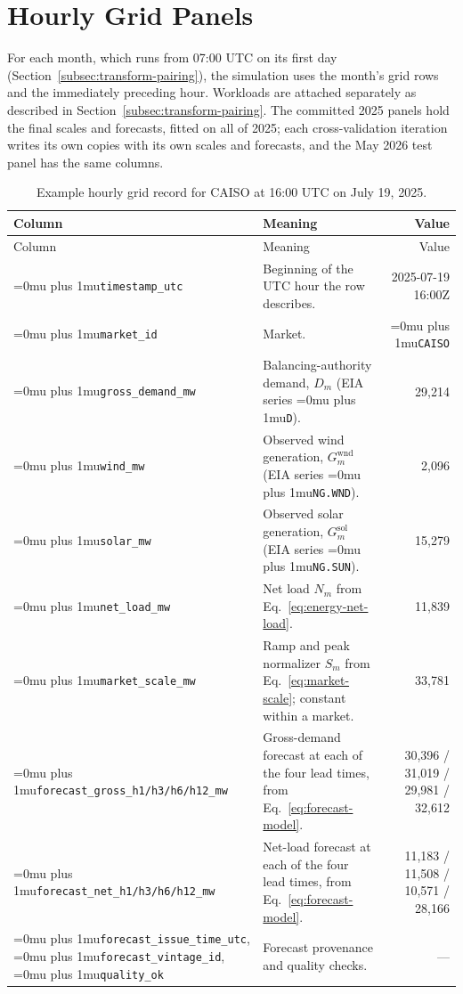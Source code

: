 \documentclass{UNCC-thesis}
\newcommand{\codepath}[1]{{\Urlmuskip=0mu plus 1mu\relax\nolinkurl{#1}}}
\begin{document}
\section{Hourly Grid Panels}
For each month, which runs from 07:00 UTC on its first day
(Section~\ref{subsec:transform-pairing}), the simulation uses the month's grid
rows and the immediately preceding hour. Workloads are attached separately as
described in Section~\ref{subsec:transform-pairing}. The committed 2025
panels hold the final scales and forecasts, fitted on all of 2025; each
cross-validation iteration writes its own copies with its own scales and
forecasts, and the May 2026 test panel has the same columns.

\begingroup
\small
\singlespacing
\begin{longtable}{@{}L{0.23\textwidth}L{0.36\textwidth}r@{}}
\caption[Example hourly grid record for CAISO]{Example hourly grid record for CAISO at 16:00 UTC on July 19, 2025.}
  \label{tab:panel-columns}\\
    \toprule
    Column & Meaning & Value \\
    \midrule
  \endfirsthead
    \toprule
    Column & Meaning & Value \\
    \midrule
  \endhead
    \codepath{timestamp_utc}
      & Beginning of the UTC hour the row describes.
      & 2025-07-19 16:00Z \\
    \codepath{market_id}
      & Market.
      & \codepath{CAISO} \\
    \addlinespace
    \codepath{gross_demand_mw}
      & Balancing-authority demand, \(D_m\) (EIA series \codepath{D}).
      & 29,214 \\
    \codepath{wind_mw}
      & Observed wind generation, \(G^{\mathrm{wnd}}_m\) (EIA series
        \codepath{NG.WND}).
      & 2,096 \\
    \codepath{solar_mw}
      & Observed solar generation, \(G^{\mathrm{sol}}_m\) (EIA series
        \codepath{NG.SUN}).
      & 15,279 \\
    \codepath{net_load_mw}
      & Net load \(N_m\) from Eq.~\eqref{eq:energy-net-load}.
      & 11,839 \\
    \addlinespace
    \codepath{market_scale_mw}
      & Ramp and peak normalizer \(S_m\) from Eq.~\eqref{eq:market-scale};
        constant within a market.
      & 33,781 \\
    \addlinespace
    \codepath{forecast_gross_h1/h3/h6/h12_mw}
      & Gross-demand forecast at each of the four lead times, from
        Eq.~\eqref{eq:forecast-model}.
      & 30,396 / 31,019 / 29,981 / 32,612 \\
    \codepath{forecast_net_h1/h3/h6/h12_mw}
      & Net-load forecast at each of the four lead times, from
        Eq.~\eqref{eq:forecast-model}.
      & 11,183 / 11,508 / 10,571 / 28,166 \\
    \codepath{forecast_issue_time_utc},
    \codepath{forecast_vintage_id},
    \codepath{quality_ok}
      & Forecast provenance and quality checks.
      & --- \\
    \bottomrule
\end{longtable}
\endgroup
\end{document}
